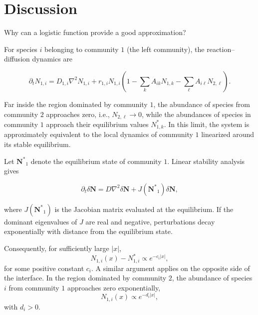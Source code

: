 \documentclass[aspectratio=169]{beamer}
\begin{document}
\section{Discussion}

    \begin{frame}{Why can a logistic function provide a good approximation?}

    For species $i$ belonging to community $1$ (the left community), the reaction--diffusion dynamics are

    \begin{equation*}
        \partial_t N_{1,i}
        =
        D_{1,i}\nabla^2 N_{1,i}
        +
        r_{1,i}N_{1,i}
        \left(
            1
            -
            \sum_k A_{ik}N_{1,k}
            -
            \sum_\ell A_{i\ell}N_{2,\ell}
        \right).
    \end{equation*}

    Far inside the region dominated by community $1$, the abundance of species from community $2$ approaches zero, i.e.,
    $N_{2,\ell}\rightarrow 0$, while the abundances of species in community $1$ approach their equilibrium values
    ${N}_{1,k}^*$.
    In this limit, the system is approximately equivalent to the local dynamics of community $1$ linearized around its stable equilibrium.

    \end{frame}

    \begin{frame}
        Let $\mathbf{N^*}_1$ denote the equilibrium state of community $1$. Linear stability analysis gives

        \begin{equation*}
            \partial_t \delta \mathbf N
            =
            D\nabla^2 \delta \mathbf N
            +
            J(\mathbf{N^*}_1)\delta \mathbf N,
        \end{equation*}

        where $J(\mathbf{N^*}_1)$ is the Jacobian matrix evaluated at the equilibrium.
        If the dominant eigenvalues of $J$ are real and negative, perturbations decay exponentially with distance from the equilibrium state. 
    \end{frame}

    \begin{frame}
        Consequently, for sufficiently large $|x|$,
        \begin{equation*}
            N_{1,i}(x)- N_{1,i}^*
            \propto
            e^{-c_i |x|},
        \end{equation*}
        for some positive constant $c_i$.
        A similar argument applies on the opposite side of the interface. In the region dominated by community $2$, the abundance of species $i$ from community $1$ approaches zero exponentially,
        \begin{equation*}
            N_{1,i}(x)
            \propto
            e^{-d_i |x|},
        \end{equation*}
        with $d_i>0$.
    \end{frame}
\end{document}
